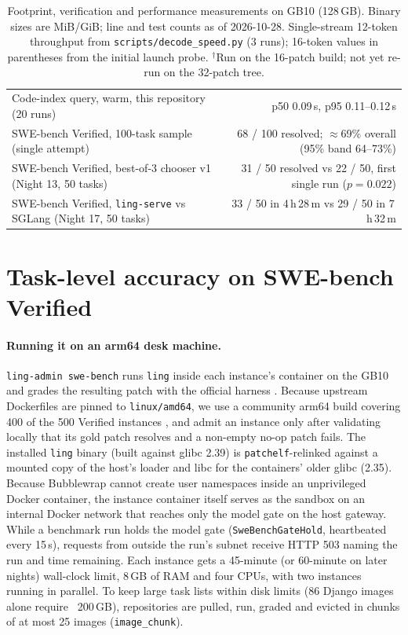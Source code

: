 \documentclass[11pt]{article}
\newcommand{\code}[1]{\texttt{#1}}
\begin{document}
\begin{table}[tbp]
\begin{tabularx}{\textwidth}{@{}X r@{}}
Code-index query, warm, this repository (20 runs) & p50 0.09\,s, p95 0.11--0.12\,s \\
SWE-bench Verified, 100-task sample (single attempt) & 68 / 100 resolved; $\approx$69\% overall (95\% band 64--73\%) \\
SWE-bench Verified, best-of-3 chooser v1 (Night 13, 50 tasks) & 31 / 50 resolved vs 22 / 50, first single run ($p = 0.022$) \\
SWE-bench Verified, \code{ling-serve} vs SGLang (Night 17, 50 tasks) & 33 / 50 in 4\,h\,28\,m vs 29 / 50 in 7\,h\,32\,m \\
\bottomrule
\end{tabularx}
\caption{Footprint, verification and performance measurements on GB10 (128\,GB). Binary sizes are
MiB/GiB; line and test counts as of 2026-10-28. Single-stream 12-token throughput from \code{scripts/decode\_speed.py} (3 runs); 16-token
values in parentheses from the initial launch probe. $^\dagger$Run on the 16-patch build; not yet
re-run on the 32-patch tree.}
\label{tab:eval}
\end{table}

\section{Task-level accuracy on SWE-bench Verified}
\label{sec:swebench}

\paragraph{Running it on an arm64 desk machine.} \code{ling-admin swe-bench} runs \code{ling}
inside each instance's container on the GB10 and grades the resulting patch with the official
harness \cite{jimenez2024swebench}. Because upstream Dockerfiles are pinned to \code{linux/amd64},
we use a community arm64 build covering 400 of the 500 Verified instances \cite{swebencharm64}, and
admit an instance only after validating locally that its gold patch resolves and a non-empty no-op
patch fails. The installed \code{ling} binary (built against glibc 2.39) is \code{patchelf}-relinked
against a mounted copy of the host's loader and libc for the containers' older glibc (2.35).
Because Bubblewrap cannot create user namespaces inside an unprivileged Docker container, the
instance container itself serves as the sandbox on an internal Docker network that reaches only the
model gate on the host gateway. While a benchmark run holds the model gate (\code{SweBenchGateHold},
heartbeated every 15\,s), requests from outside the run's subnet receive HTTP 503 naming the run
and time remaining. Each instance gets a 45-minute (or 60-minute on later nights) wall-clock limit,
8\,GB of RAM and four CPUs, with two instances running in parallel. To keep large task lists within
disk limits (86 Django images alone require ~200\,GB), repositories are pulled, run, graded and
evicted in chunks of at most 25 images (\code{image\_chunk}).
\end{document}
